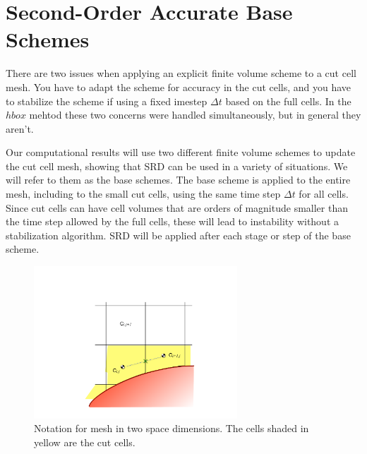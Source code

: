 \section{Second-Order Accurate Base Schemes}\label{sec:basefv}

There are two issues when applying an explicit finite volume scheme to a cut cell
mesh.  You have to adapt the scheme for accuracy in the cut cells, and you
have to stabilize the scheme if using a fixed imestep $\Delta t$ based on
the full cells. In the $hbox$ mehtod these two concerns were handled
simultaneously, but in general they aren't.

Our computational results will use two different finite volume schemes
to update the cut cell mesh, showing that SRD can be used in a
variety of situations.
We will refer to them as the base schemes. 
The  base scheme is applied to the entire mesh, including  
to the small cut cells, using the same time step $\Delta t$ for all cells.  
Since cut cells can have cell volumes that are
orders of magnitude smaller than the time step allowed by the full
cells, these will lead to instability without a stabilization algorithm.
SRD will be applied after each stage or step of the base scheme.

\begin{figure}
\begin{center}
\includegraphics[width=3.0in]{figs/2dfig.pdf}
\caption{\sf Notation for mesh in two space dimensions. The cells shaded
in yellow are the cut cells.} 
\label{fig:2dfig}
\end{center}
\end{figure}

